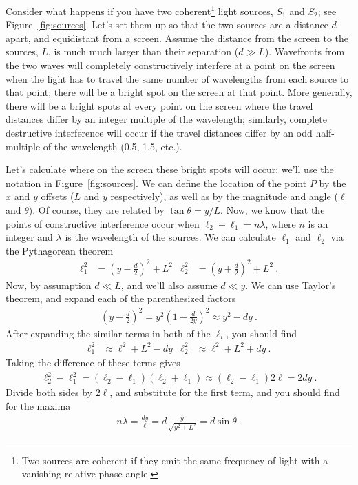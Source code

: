 \documentclass[12pt]{article}
\newcommand{\Sone}{\ensuremath{S_1}\xspace}
\newcommand{\Stwo}{\ensuremath{S_2}\xspace}
\begin{document}
Consider what happens if you have two coherent\footnote{Two sources
  are coherent if they emit the same frequency of light with a
  vanishing relative phase angle.} light sources, \Sone and \Stwo; see
Figure~\ref{fig:sources}.  Let's set them up so that the two sources
are a distance $d$ apart, and equidistant from a screen.  Assume the
distance from the screen to the sources, $L$, is much much larger than
their separation ($d\gg L$).  Wavefronts from the two waves will
completely constructively interfere at a point on the screen when the
light has to travel the same number of wavelengths from each source to
that point; there will be a bright spot on the screen at that point.
More generally, there will be a bright spots at every point on the
screen where the travel distances differ by an integer multiple of the
wavelength; similarly, complete destructive interference will occur if
the travel distances differ by an odd half-multiple of the wavelength
(0.5, 1.5, etc.).

Let's calculate where on the screen these bright spots will occur;
we'll use the notation in Figure~\ref{fig:sources}.  We can define the
location of the point $P$ by the $x$ and $y$ offsets ($L$ and $y$
respectively), as well as by the magnitude and angle ($\ell$ and
$\theta$).  Of course, they are related by $\tan\theta = y/L$.  Now,
we know that the points of constructive interference occur when
$\ell_2 - \ell_1 = n \lambda$, where $n$ is an integer and $\lambda$
is the wavelength of the sources.  We can calculate $\ell_1$ and
$\ell_2$ via the Pythagorean theorem
\begin{align*}
  \ell_1^2 &= \left(y - \frac{d}{2}\right)^2 + L^2 & 
  \ell_2^2 &= \left(y + \frac{d}{2}\right)^2 + L^2\ .
\end{align*}
Now, by assumption $d \ll L$, and we'll also assume $d \ll y$.  We can
use Taylor's theorem, and expand each of the parenthesized factors
\begin{gather*}
  \left(y - \frac{d}{2}\right)^2 =   y^2 \left(1 -
    \frac{d}{2y}\right)^2 \approx 
  y^2 - dy\ .
\end{gather*}
After expanding the similar terms in both of the $\ell_i$, you should
find
\begin{align*}
  \ell_1^2 &\approx \ell^2 + L^2 - dy &
  \ell_2^2 &\approx \ell^2 + L^2 + dy \ .
\end{align*}
Taking the difference of these terms gives
\begin{gather*}
  \ell_2^2 - \ell_1^2 = \left( \ell_2 - \ell_1 \right) \left( \ell_2 +
    \ell_1 \right) \approx \left( \ell_2 - \ell_1 \right) 2 \ell = 2dy\ .
\end{gather*}
Divide both sides by $2\ell$, and substitute for the first term, and
you should find for the maxima
\begin{gather}
  n \lambda = \frac{dy}{\ell} = d \frac{y}{\sqrt{y^2 + L^2}} = d
  \sin\theta\ .
\label{eq:grating}
\end{gather}
\end{document}
